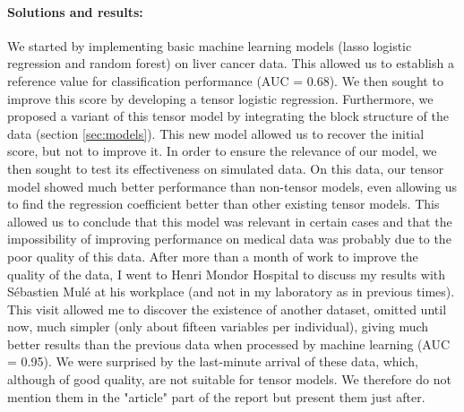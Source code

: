 \documentclass[preprint,12pt]{elsarticle}
\begin{document}
\paragraph*{Solutions and results:} We started by implementing basic machine learning models (lasso logistic regression and random forest) on liver cancer data. This allowed us to establish a reference value for classification performance (AUC = 0.68). We then sought to improve this score by developing a tensor logistic regression. Furthermore, we proposed a variant of this tensor model by integrating the block structure of the data (section \ref{sec:models}). This new model allowed us to recover the initial score, but not to improve it.
\indent In order to ensure the relevance of our model, we then sought to test its effectiveness on simulated data. On this data, our tensor model showed much better performance than non-tensor models, even allowing us to find the regression coefficient better than other existing tensor models. This allowed us to conclude that this model was relevant in certain cases and that the impossibility of improving performance on medical data was probably due to the poor quality of this data. After more than a month of work to improve the quality of the data, I went to Henri Mondor Hospital to discuss my results with Sébastien Mulé at his workplace (and not in my laboratory as in previous times). This visit allowed me to discover the existence of another dataset, omitted until now, much simpler (only about fifteen variables per individual), giving much better results than the previous data when processed by machine learning (AUC = 0.95). We were surprised by the last-minute arrival of these data, which, although of good quality, are not suitable for tensor models. We therefore do not mention them in the "article" part of the report but present them just after.




\restoregeometry

\newpage
\tableofcontents
\newpage
\end{document}
